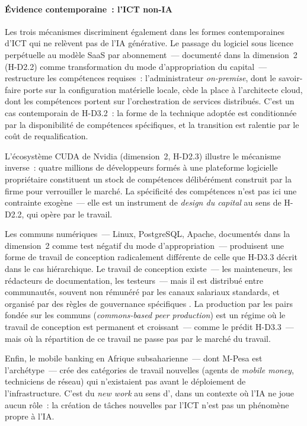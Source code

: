 \paragraph{\'Evidence contemporaine~: l'ICT non-IA}

Les trois m\'ecanismes discriminent \'egalement dans les formes contemporaines d'ICT qui ne rel\`event pas de l'IA g\'en\'erative. Le passage du logiciel sous licence perp\'etuelle au mod\`ele SaaS par abonnement~--- document\'e dans la dimension~2 (H-D2.2) comme transformation du mode d'appropriation du capital~--- restructure les comp\'etences requises~: l'administrateur \emph{on-premise}, dont le savoir-faire porte sur la configuration mat\'erielle locale, c\`ede la place \`a l'architecte cloud, dont les comp\'etences portent sur l'orchestration de services distribu\'es. C'est un cas contemporain de H-D3.2~: la forme de la technique adopt\'ee est conditionn\'ee par la disponibilit\'e de comp\'etences sp\'ecifiques, et la transition est ralentie par le co\^ut de requalification.

L'\'ecosyst\`eme CUDA de Nvidia (dimension~2, H-D2.3) illustre le m\'ecanisme inverse~: quatre millions de d\'eveloppeurs form\'es \`a une plateforme logicielle propri\'etaire constituent un stock de comp\'etences d\'elib\'er\'ement construit par la firme pour verrouiller le march\'e. La sp\'ecificit\'e des comp\'etences n'est pas ici une contrainte exog\`ene~--- elle est un instrument de \emph{design du capital} au sens de H-D2.2, qui op\`ere par le travail.

Les communs num\'eriques~--- Linux, PostgreSQL, Apache, document\'es dans la dimension~2 comme test n\'egatif du mode d'appropriation~--- produisent une forme de travail de conception radicalement diff\'erente de celle que H-D3.3 d\'ecrit dans le cas hi\'erarchique. Le travail de conception existe~--- les mainteneurs, les r\'edacteurs de documentation, les testeurs~--- mais il est distribu\'e entre communaut\'es, souvent non r\'emun\'er\'e par les canaux salariaux standards, et organis\'e par des r\`egles de gouvernance sp\'ecifiques \parencite{benkler_wealth_2006}. La production par les pairs fond\'ee sur les communs (\emph{commons-based peer production}) est un r\'egime o\`u le travail de conception est permanent et croissant~--- comme le pr\'edit H-D3.3~--- mais o\`u la r\'epartition de ce travail ne passe pas par le march\'e du travail.

Enfin, le mobile banking en Afrique subsaharienne~--- dont M-Pesa est l'arch\'etype~--- cr\'ee des cat\'egories de travail nouvelles (agents de \emph{mobile money}, techniciens de r\'eseau) qui n'existaient pas avant le d\'eploiement de l'infrastructure. C'est du \emph{new work} au sens d'\textcite{autor_new_2024}, dans un contexte o\`u l'IA ne joue aucun r\^ole~: la cr\'eation de t\^aches nouvelles par l'ICT n'est pas un ph\'enom\`ene propre \`a l'IA.

